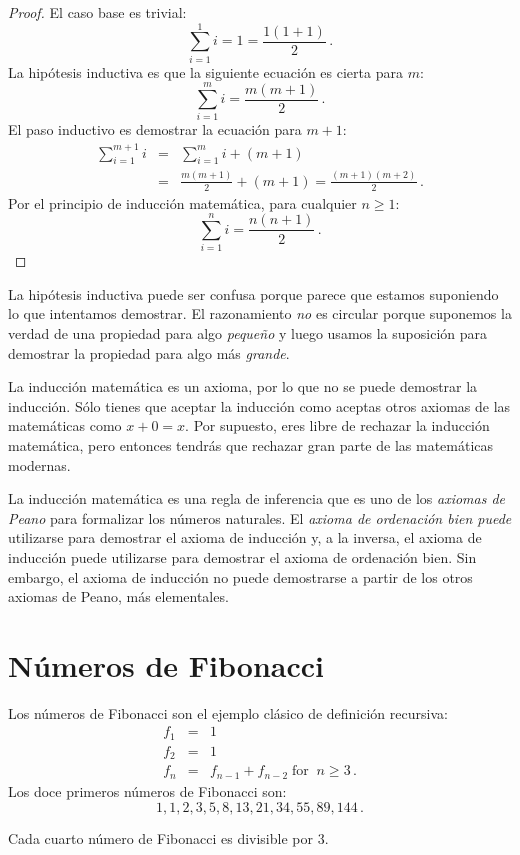\begin{proof} El caso base es trivial:
\[
\sum_{i=1}^1 i = 1 =\frac{1(1+1)}{2}\,.
\]
La hipótesis inductiva es que la siguiente ecuación es cierta para $m$:
\[
\sum_{i=1}^{m} i = \frac{m(m+1)}{2}\,.
\]
El paso inductivo es demostrar la ecuación para $m+1$:
\begin{eqnarray*}
\sum_{i=1}^{m+1} i &=& \sum_{i=1}^m i + (m+1)\label{l.sum1}\\
&=&\frac{m(m+1)}{2} + (m+1)\label{l.sum2}
=\frac{(m+1)(m+2)}{2}\,.\label{l.sum4}
\end{eqnarray*}
Por el principio de inducción matemática, para cualquier $n\geq 1$:
\[
\sum_{i=1}^n i = \frac{n(n+1)}{2}\,.
\]
\end{proof}

La hipótesis inductiva puede ser confusa porque parece que estamos suponiendo lo que intentamos demostrar. El razonamiento \emph{no} es circular porque suponemos la verdad de una propiedad para algo \emph{pequeño} y luego usamos la suposición para demostrar la propiedad para algo más \emph{grande}.

La inducción matemática es un axioma, por lo que no se puede demostrar la inducción. Sólo tienes que aceptar la inducción como aceptas otros axiomas de las matemáticas como $x+0=x$. Por supuesto, eres libre de rechazar la inducción matemática, pero entonces tendrás que rechazar gran parte de las matemáticas modernas.
\begin{advanced}
La inducción matemática es una regla de inferencia que es uno de los \emph{axiomas de Peano} para formalizar los números naturales. El \emph{axioma de ordenación bien puede} utilizarse para demostrar el axioma de inducción y, a la inversa, el axioma de inducción puede utilizarse para demostrar el axioma de ordenación bien. Sin embargo, el axioma de inducción no puede demostrarse a partir de los otros axiomas de Peano, más elementales.
\end{advanced}


\section{Números de Fibonacci}\label{s.induction-fibonacci}
Los números de Fibonacci son el ejemplo clásico de definición recursiva:
\begin{eqnarray*}
f_1 &=& 1\\
f_2 &=& 1\\
f_n &=& f_{n-1} + f_{n-2}\; \textrm{for} \;\; n \geq 3\,.
\end{eqnarray*}
Los doce primeros números de Fibonacci son:
\[
1, 1, 2, 3, 5, 8, 13, 21, 34, 55, 89, 144\,.
\]
\begin{theorem}\label{thm.fib-div3}
Cada cuarto número de Fibonacci es divisible por $3$.
\end{theorem}


